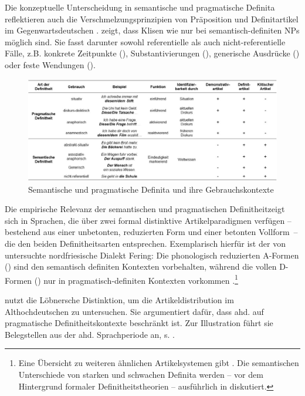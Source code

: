 Die konzeptuelle Unterscheidung in semantische und pragmatische Definita reflektieren auch  die Verschmelzungsprinzipien von Präposition und Definitartikel im Gegenwartsdeutschen \parencite[311-312]{Lobner1985}. \textcite[109-110]{Nubling2005} zeigt, dass Klisen wie  nur bei semantisch-definiten NPs möglich sind. Sie fasst darunter sowohl referentielle als auch nicht-referentielle Fälle, z.B. konkrete Zeitpunkte (),  Substantivierungen (), generische Ausdrücke () oder feste Wendungen (). 

\begin{figure}[h]
\includegraphics[width=\textwidth]{images/definit-kontexte-transparent.jpg}
\caption {Semantische und pragmatische Definita und ihre Gebrauchskontexte\label{abb:definita}}
\end{figure}

Die empirische Relevanz der semantischen und pragmatischen Definitheit\linebreak zeigt sich in Sprachen, die über zwei formal distinktive Artikelparadigmen verfügen -- bestehend aus einer unbetonten, reduzierten Form und einer betonten Vollform~-- die den beiden Definitheitsarten entsprechen. Exemplarisch hierfür ist der von \textcite{Ebert1971} untersuchte  nordfriesische Dialekt Fering: Die phonologisch reduzierten A-Formen () sind den semantisch definiten Kontexten vorbehalten, während die vollen D-Formen () nur in pragmatisch-definiten Kontexten vorkommen \parencite[529]{deMulder2011}.\footnote{Eine Übersicht zu weiteren ähnlichen Artikelsystemen gibt \textcite[]{Studler2011}. Die semantischen Unterschiede von starken und schwachen Definita werden -- vor dem Hintergrund formaler Definitheitstheorien -- ausführlich in \textcite{Schwarz2009} diskutiert.}

\textcite[112--117]{Demske2001} nutzt die Löbnersche Distinktion, um die Artikeldistribution im Althochdeutschen zu untersuchen. Sie argumentiert dafür, dass ahd.   auf pragmatische Definitheitskontexte beschränkt ist. Zur Illustration führt sie Belegstellen aus der ahd. Sprachperiode an, s. . 

